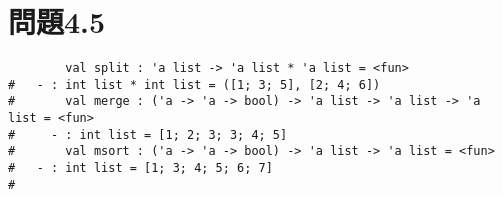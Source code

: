 \documentclass[a4paper,12pt]{jarticle}
\begin{document}
\section*{問題4.5}

\begin{lstlisting}
        val split : 'a list -> 'a list * 'a list = <fun>
#   - : int list * int list = ([1; 3; 5], [2; 4; 6])
#       val merge : ('a -> 'a -> bool) -> 'a list -> 'a list -> 'a list = <fun>
#     - : int list = [1; 2; 3; 3; 4; 5]
#       val msort : ('a -> 'a -> bool) -> 'a list -> 'a list = <fun>
#   - : int list = [1; 3; 4; 5; 6; 7]
# 
\end{lstlisting}
\end{document}
